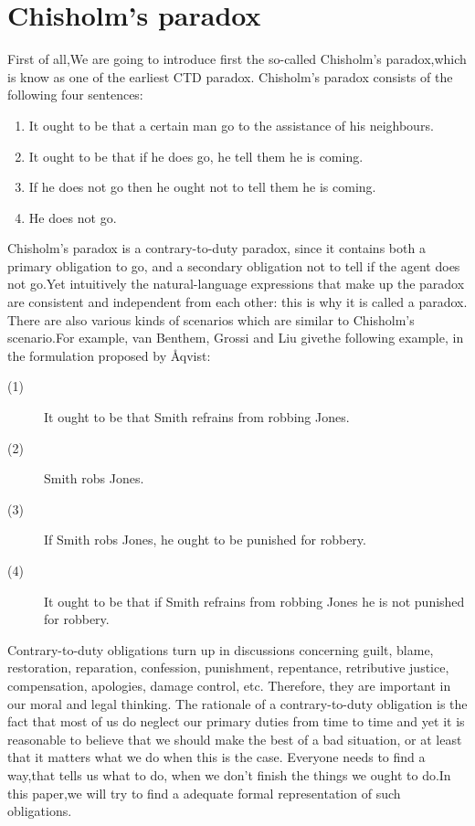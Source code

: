 \documentclass{article}
\begin{document}
\section{ Chisholm's paradox}
First of all,We are going to introduce first the so-called Chisholm's paradox\cite{2},which is know as one of the earliest CTD paradox.
Chisholm's paradox consists of the following four sentences:
\begin{enumerate}
\item  It ought to be that a certain man go to the assistance of his neighbours.
\item  It ought to be that if he does go, he tell them he is coming.
\item If he does not go then he ought not to tell them he is coming.
\item He does not go.
\end{enumerate}
Chisholm’s paradox is a contrary-to-duty paradox, since it contains both a primary obligation to go, and a secondary obligation not to tell if the agent does not go.Yet intuitively the natural-language expressions
that make up the paradox are consistent and independent from each other: this is
why it is called a paradox.\\
There are also various kinds of scenarios which are similar to Chisholm’s scenario.For example, van Benthem, Grossi and Liu \cite{3} givethe following example, in the formulation proposed by Åqvist:\\
\begin{description}
\item[(1)] It ought to be that Smith refrains from robbing Jones.
\item[(2)] Smith robs Jones.
\item[(3)]If Smith robs Jones, he ought to be punished for robbery.
\item[(4)]It ought to be that if Smith refrains from robbing Jones he is not punished
for robbery.
\end{description}



Contrary-to-duty obligations turn up in discussions concerning guilt, blame, restoration, reparation, confession, punishment, repentance, retributive justice, compensation, apologies, damage control, etc. Therefore, they are important in our moral and legal thinking. The rationale of a contrary-to-duty obligation is the fact that most of us do neglect our primary duties from time to time and yet it is reasonable to believe that we should make the best of a bad situation, or at least that it matters what we do when this is the case. Everyone needs to find a way,that tells us what to do, when we don't finish the things we ought to do.In this paper,we will try to find a adequate formal representation of such obligations.
\end{document}
